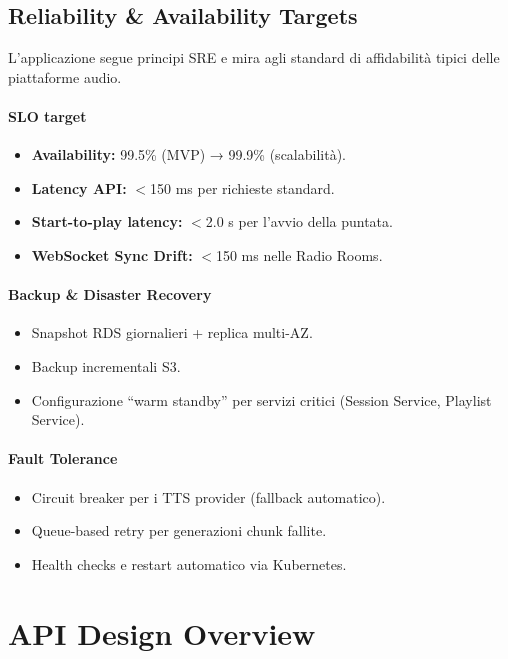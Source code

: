 \documentclass[11pt,a4paper]{article}
\begin{document}
\subsection{Reliability \& Availability Targets}

L’applicazione segue principi SRE e mira agli standard di affidabilità tipici delle piattaforme audio.

\paragraph{SLO target}
\begin{itemize}
    \item \textbf{Availability:} 99.5\% (MVP) → 99.9\% (scalabilità).
    \item \textbf{Latency API:} $<$150 ms per richieste standard.
    \item \textbf{Start-to-play latency:} $<$2.0 s per l’avvio della puntata.
    \item \textbf{WebSocket Sync Drift:} $<$150 ms nelle Radio Rooms.
\end{itemize}

\paragraph{Backup \& Disaster Recovery}
\begin{itemize}
    \item Snapshot RDS giornalieri + replica multi-AZ.
    \item Backup incrementali S3.
    \item Configurazione “warm standby” per servizi critici (Session Service, Playlist Service).
\end{itemize}

\paragraph{Fault Tolerance}
\begin{itemize}
    \item Circuit breaker per i TTS provider (fallback automatico).
    \item Queue-based retry per generazioni chunk fallite.
    \item Health checks e restart automatico via Kubernetes.
\end{itemize}
\section{API Design Overview}
\end{document}
